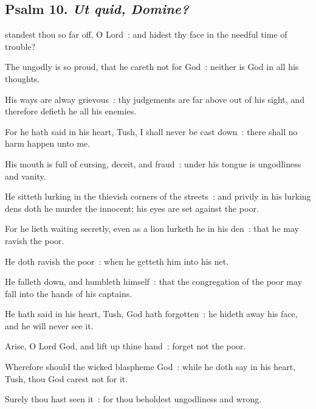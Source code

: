 \subsection{Psalm 10. \textit{Ut quid, Domine?}}



 standest thou so far off, O Lord~: and hidest thy face in the needful time of trouble?\par
{}
The ungodly is so proud, that he careth not for God~: neither is God in all his thoughts.\par
{}His ways are alway grievous~: thy judgements are far above out of his sight, and therefore defieth he all his enemies.\par
{}For he hath said in his heart, Tush, I shall never be cast down~: there shall no harm happen unto me.\par
{}His mouth is full of cursing, deceit, and fraud~: under his tongue is ungodliness and vanity.\par
{}He sitteth lurking in the thievish corners of the streets~: and privily in his lurking dens doth he murder the innocent; his eyes are set against the poor.\par
{}For he lieth waiting secretly, even as a lion lurketh he in his den~: that he may ravish the poor.\par
{}He doth ravish the poor~: when he getteth him into his net.\par
{}He falleth down, and humbleth himself~: that the congregation of the poor may fall into the hands of his captains.\par
{}He hath said in his heart, Tush, God hath forgotten~: he hideth away his face, and he will never see it.\par
{}Arise, O Lord God, and lift up thine hand~: forget not the poor.\par
{}Wherefore should the wicked blaspheme God~: while he doth say in his heart, Tush, thou God carest not for it.\par
{}Surely thou hast seen it~: for thou beholdest ungodliness and wrong.\par
